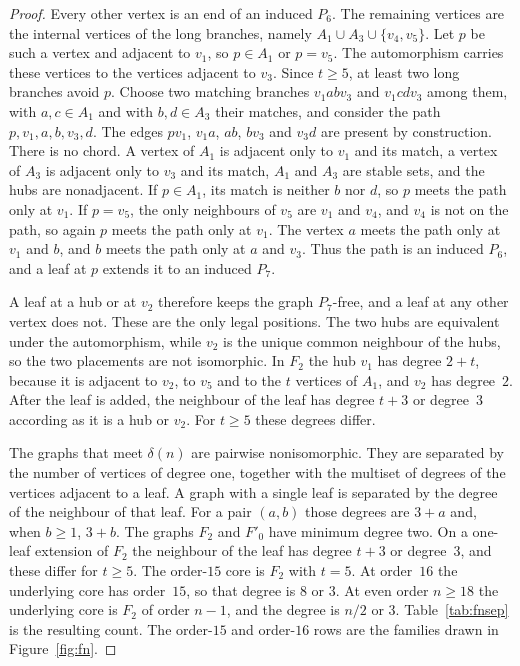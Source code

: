 \documentclass[ASNA]{USG}
\theoremstyle{WBstyletwo}
\numberwithin{equation}{section}
\begin{document}
\begin{proof}
Every other vertex is an end of an induced $P_6$. The remaining vertices are the internal vertices of the long branches, namely $A_1\cup A_3\cup\{v_4,v_5\}$. Let $p$ be such a vertex and adjacent to $v_1$, so $p\in A_1$ or $p=v_5$. The automorphism carries these vertices to the vertices adjacent to $v_3$. Since $t\ge 5$, at least two long branches avoid $p$. Choose two matching branches $v_1abv_3$ and $v_1cdv_3$ among them, with $a,c\in A_1$ and with $b,d\in A_3$ their matches, and consider the path $p,v_1,a,b,v_3,d$. The edges $pv_1$, $v_1a$, $ab$, $bv_3$ and $v_3d$ are present by construction. There is no chord. A vertex of $A_1$ is adjacent only to $v_1$ and its match, a vertex of $A_3$ is adjacent only to $v_3$ and its match, $A_1$ and $A_3$ are stable sets, and the hubs are nonadjacent. If $p\in A_1$, its match is neither $b$ nor $d$, so $p$ meets the path only at $v_1$. If $p=v_5$, the only neighbours of $v_5$ are $v_1$ and $v_4$, and $v_4$ is not on the path, so again $p$ meets the path only at $v_1$. The vertex $a$ meets the path only at $v_1$ and $b$, and $b$ meets the path only at $a$ and $v_3$. Thus the path is an induced $P_6$, and a leaf at $p$ extends it to an induced $P_7$.

A leaf at a hub or at $v_2$ therefore keeps the graph $P_7$-free, and a leaf at any other vertex does not. These are the only legal positions. The two hubs are equivalent under the automorphism, while $v_2$ is the unique common neighbour of the hubs, so the two placements are not isomorphic. In $F_2$ the hub $v_1$ has degree $2+t$, because it is adjacent to $v_2$, to $v_5$ and to the $t$ vertices of $A_1$, and $v_2$ has degree~$2$. After the leaf is added, the neighbour of the leaf has degree $t+3$ or degree~$3$ according as it is a hub or $v_2$. For $t\ge 5$ these degrees differ.

The graphs that meet $\delta(n)$ are pairwise nonisomorphic. They are separated by the number of vertices of degree one, together with the multiset of degrees of the vertices adjacent to a leaf. A graph with a single leaf is separated by the degree of the neighbour of that leaf. For a pair $(a,b)$ those degrees are $3+a$ and, when $b\ge 1$, $3+b$. The graphs $F_2$ and $F'_0$ have minimum degree two. On a one-leaf extension of $F_2$ the neighbour of the leaf has degree $t+3$ or degree~$3$, and these differ for $t\ge 5$. The order-$15$ core is $F_2$ with $t=5$. At order~$16$ the underlying core has order~$15$, so that degree is $8$ or $3$. At even order $n\ge 18$ the underlying core is $F_2$ of order $n-1$, and the degree is $n/2$ or $3$. Table~\ref{tab:fnsep} is the resulting count. The order-$15$ and order-$16$ rows are the families drawn in Figure~\ref{fig:fn}.
\end{proof}
\end{document}
